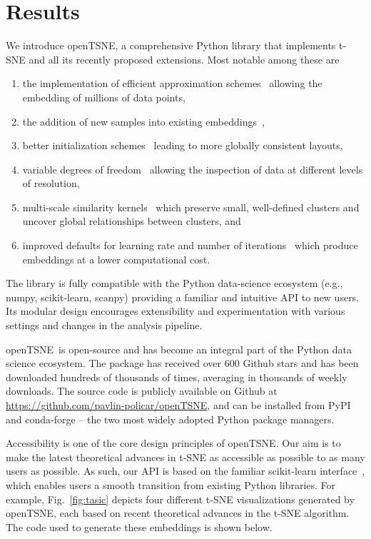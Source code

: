 \documentclass[twocolumn]{bmcart}
\newcommand{\opentsne}{\textsf{openTSNE}}
\begin{document}
\section*{Results}

We introduce \opentsne, a comprehensive Python library that implements t-SNE
and all its recently proposed extensions. Most notable among these are
\begin{enumerate}
\item the implementation of efficient approximation 
	schemes~\cite{van2014accelerating,linderman2019fast} allowing the embedding
	of millions of data points,
\item the addition of new samples into existing
	embeddings~\cite{policar2019embedding},
\item better initialization schemes~\cite{kobak2019umap} leading to more
	globally consistent layouts,
\item variable degrees of freedom~\cite{kobak2019heavy} allowing the inspection
	of data at different levels of resolution,
\item multi-scale similarity kernels~\cite{kobak2019art} which preserve small,
	well-defined clusters and uncover global relationships between clusters,
	and
\item improved defaults for learning rate and number of
	iterations~\cite{belkina2019automated} which produce embeddings at a lower
	computational cost.
\end{enumerate}

The library is fully compatible with the Python data-science ecosystem (e.g.,
\textsf{numpy}, \textsf{scikit-learn}, \textsf{scanpy}) providing a familiar
and intuitive API to new users. Its modular design encourages
extensibility and experimentation with various settings and changes in the
analysis pipeline.

\opentsne\ is open-source and has become an integral part of the Python data
science ecosystem. The package has received over 600 Github stars and has been
downloaded hundreds of thousands of times, averaging in thousands of weekly
downloads. The source code is publicly available on Github at
\url{https://github.com/pavlin-policar/openTSNE}, and can be installed from
\textsf{PyPI} and \textsf{conda-forge} -- the two most widely adopted Python
package managers.

Accessibility is one of the core design principles of \opentsne. Our aim is to
make the latest theoretical advances in t-SNE as accessible as possible to as
many users as possible. As such, our API is based on the familiar
\textsf{scikit-learn} interface~\cite{sklearn_api}, which enables users a
smooth transition from existing Python libraries. For example,
Fig.~\ref{fig:tasic} depicts four different t-SNE visualizations generated by
\opentsne, each based on recent theoretical advances in the t-SNE algorithm. The code used
to generate these embeddings is shown below.
\end{document}
